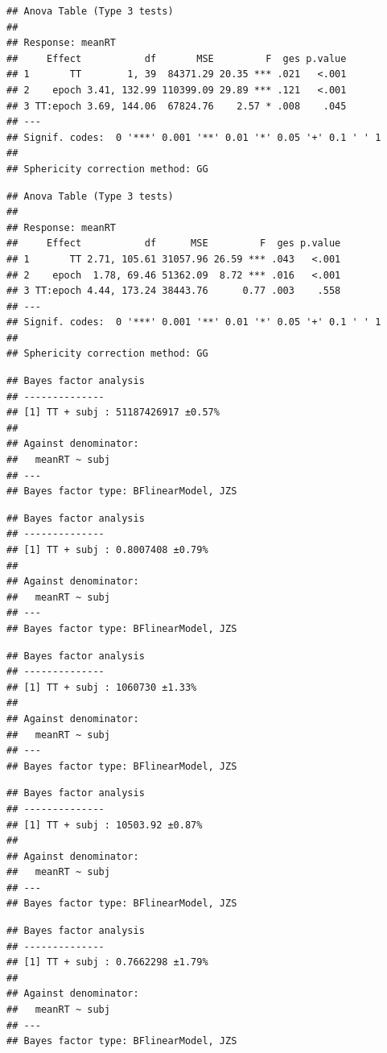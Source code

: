 \documentclass[
  man]{apa6}
\begin{document}
\begin{verbatim}
## Anova Table (Type 3 tests)
## 
## Response: meanRT
##     Effect           df       MSE         F  ges p.value
## 1       TT        1, 39  84371.29 20.35 *** .021   <.001
## 2    epoch 3.41, 132.99 110399.09 29.89 *** .121   <.001
## 3 TT:epoch 3.69, 144.06  67824.76    2.57 * .008    .045
## ---
## Signif. codes:  0 '***' 0.001 '**' 0.01 '*' 0.05 '+' 0.1 ' ' 1
## 
## Sphericity correction method: GG
\end{verbatim}

\begin{verbatim}
## Anova Table (Type 3 tests)
## 
## Response: meanRT
##     Effect           df      MSE         F  ges p.value
## 1       TT 2.71, 105.61 31057.96 26.59 *** .043   <.001
## 2    epoch  1.78, 69.46 51362.09  8.72 *** .016   <.001
## 3 TT:epoch 4.44, 173.24 38443.76      0.77 .003    .558
## ---
## Signif. codes:  0 '***' 0.001 '**' 0.01 '*' 0.05 '+' 0.1 ' ' 1
## 
## Sphericity correction method: GG
\end{verbatim}

\begin{verbatim}
## Bayes factor analysis
## --------------
## [1] TT + subj : 51187426917 ±0.57%
## 
## Against denominator:
##   meanRT ~ subj 
## ---
## Bayes factor type: BFlinearModel, JZS
\end{verbatim}

\begin{verbatim}
## Bayes factor analysis
## --------------
## [1] TT + subj : 0.8007408 ±0.79%
## 
## Against denominator:
##   meanRT ~ subj 
## ---
## Bayes factor type: BFlinearModel, JZS
\end{verbatim}

\begin{verbatim}
## Bayes factor analysis
## --------------
## [1] TT + subj : 1060730 ±1.33%
## 
## Against denominator:
##   meanRT ~ subj 
## ---
## Bayes factor type: BFlinearModel, JZS
\end{verbatim}

\begin{verbatim}
## Bayes factor analysis
## --------------
## [1] TT + subj : 10503.92 ±0.87%
## 
## Against denominator:
##   meanRT ~ subj 
## ---
## Bayes factor type: BFlinearModel, JZS
\end{verbatim}

\begin{verbatim}
## Bayes factor analysis
## --------------
## [1] TT + subj : 0.7662298 ±1.79%
## 
## Against denominator:
##   meanRT ~ subj 
## ---
## Bayes factor type: BFlinearModel, JZS
\end{verbatim}
\end{document}
